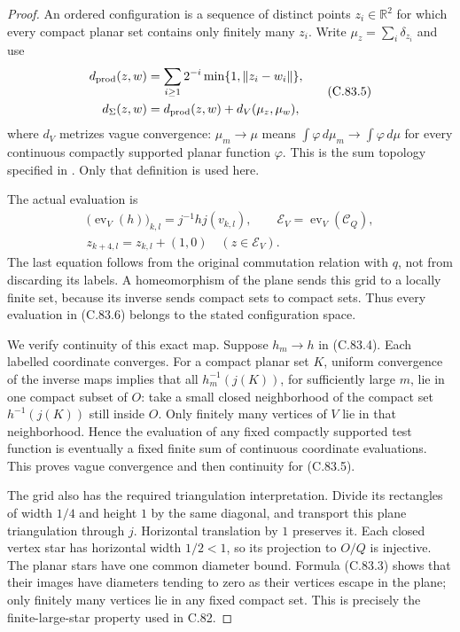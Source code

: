 \begin{proof}
An ordered configuration is a sequence of
distinct points $z_i\in\mathbb R^2$ for which
every compact planar set contains only
finitely many $z_i$. Write
$\mu_z=\sum_i\delta_{z_i}$ and use
\[
 \begin{split}
 d_{\rm prod}(z,w)
    &=\sum_{i\geq1}2^{-i}\min\{1,\|z_i-w_i\|\},\\
 d_\Sigma(z,w)
    &=d_{\rm prod}(z,w)+d_V(\mu_z,\mu_w),
 \end{split}                                                    \tag{C.83.5}
\]
where $d_V$ metrizes vague convergence:
$\mu_m\to\mu$ means
$\int\varphi\,d\mu_m\to\int\varphi\,d\mu$
for every continuous compactly supported
planar function $\varphi$.
This is the sum topology specified in
\cite[Definition 2.6 and equation (2), pp.~5--6]
      {C_TehConfigurations2026}.
Only that definition is used here.

The actual evaluation is
\[
 \begin{gathered}
 \bigl(\operatorname{ev}_V(h)\bigr)_{k,l}
       =j^{-1}h j(v_{k,l}),\qquad
 \mathscr E_V=\operatorname{ev}_V(\mathscr C_Q),\\
 z_{k+4,l}=z_{k,l}+(1,0)
                \quad(z\in\mathscr E_V).
 \end{gathered}                                                  \tag{C.83.6}
\]
The last equation follows from the original
commutation relation with $q$, not from
discarding its labels. A homeomorphism of
the plane sends this grid to a locally
finite set, because its inverse sends
compact sets to compact sets. Thus every
evaluation in (C.83.6) belongs to the stated
configuration space.

We verify continuity of this exact map.
Suppose $h_m\to h$ in (C.83.4).
Each labelled coordinate converges.
For a compact planar set $K$, uniform
convergence of the inverse maps implies that
all $h_m^{-1}(j(K))$, for sufficiently large
$m$, lie in one compact subset of $O$:
take a small closed neighborhood of the
compact set $h^{-1}(j(K))$ still inside $O$.
Only finitely many vertices of $V$ lie
in that neighborhood. Hence the evaluation
of any fixed compactly supported test
function is eventually a fixed finite
sum of continuous coordinate evaluations.
This proves vague convergence and then
continuity for (C.83.5).

The grid also has the required triangulation
interpretation. Divide its rectangles of
width $1/4$ and height $1$ by the same
diagonal, and transport this plane
triangulation through $j$.
Horizontal translation by $1$ preserves it.
Each closed vertex star has horizontal
width $1/2<1$, so its projection to
$O/Q$ is injective. The planar stars have
one common diameter bound. Formula
(C.83.3) shows that their images have
diameters tending to zero as their
vertices escape in the plane; only
finitely many vertices lie in any fixed
compact set. This is precisely the
finite-large-star property used in C.82.


\end{proof}
